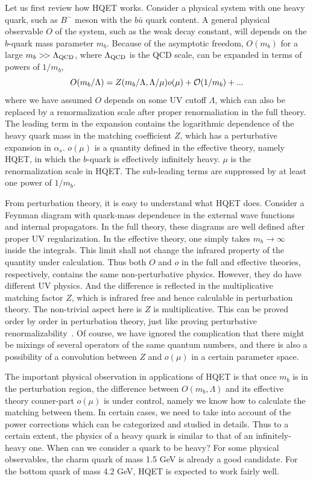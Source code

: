 Let us first review how HQET works. Consider a physical system with one heavy quark, such as
$B^-$ meson with the $b\bar u$ quark content. A general physical observable $O$ of the system,
such as the weak decay constant, will depends on the $b$-quark mass parameter $m_b$.
Because of the asymptotic freedom, $O(m_b)$ for a large $m_b>\!>\Lambda_{\rm QCD}$, where $\Lambda_{\rm QCD}$
is the QCD scale, can be expanded in terms of powers of $1/m_b$,
\begin{equation}
             O(m_b/\Lambda) = Z(m_b/\Lambda, \Lambda/\mu)o(\mu) + {\cal O}(1/m_b)+ ...
\end{equation}
where we have assumed $O$ depends on some UV cutoff $\Lambda$, which can also be replaced
by a renormalization scale after proper renormaliation in the full theory.
The leading term in the expansion contains the logarithmic dependence of the heavy
quark mass in the matching coefficient $Z$, which has a perturbative
expansion in $\alpha_s$. $o(\mu)$ is a quantity defined in the effective theory,
namely HQET, in which the $b$-quark is effectively infinitely heavy.
$\mu$ is the renormalization scale in HQET. The sub-leading terms are suppressed
by at least one power of $1/m_b$.

From perturbation theory, it is easy to understand what HQET does. Consider a Feynman diagram
with quark-mass dependence in the external wave functions and internal propagators. In the full theory,
these diagrams are well defined after proper UV regularization. In the effective theory, one simply
takes $m_b\rightarrow \infty$ inside the integrals. This limit shall not change the infrared
property of the quantity under calculation. Thus both $O$ and $o$ in the full and effective theories, respectively,
contains the same non-perturbative physics. However, they do have different UV physics.
And the difference is reflected in the multiplicative matching factor $Z$, which is infrared free
and hence calculable in perturbation theory. The non-trivial aspect here is $Z$
is multiplicative. This can be proved order by order in perturbation theory, just like
proving perturbative renormalizability~\cite{Collins:1984xc}. Of course, we have ignored the complication
that there might be mixings of several operators of the same quantum numbers, and
there is also a possibility of a convolution between $Z$ and $o(\mu)$ in a certain parameter space.

The important physical observation in applications of HQET is that once $m_b$ is in the perturbation region,
the difference between $O(m_b, \Lambda)$ and its effective theory couner-part $o(\mu)$ is under control, namely we know
how to calculate the matching between them. In certain cases, we need to take into account
of the power corrections which can be categorized and studied in details. Thus to a certain extent,
the physics of a heavy quark is similar to that of an infinitely-heavy one. When can we consider a quark
to be heavy? For some physical observables, the charm quark of mass 1.5 GeV is already a good candidate.
For the bottom quark of mass 4.2 GeV, HQET is expected to work fairly well.

